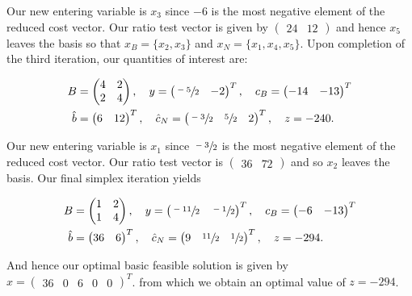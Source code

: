 \begin{solution}
  Our new entering variable is $x_3$ since $-6$ is the most negative element of the reduced cost vector. Our ratio test 
  vector is given by $\begin{pmatrix} 24 & 12 \end{pmatrix}$ and hence $x_5$ leaves the basis so that 
  $x_B = \{ x_2, x_3 \}$ and $x_N = \{ x_1, x_4, x_5 \}$. Upon completion of the third iteration, our quantities of 
  interest are:

  \begin{align*}
    B &= \begin{pmatrix}
      4 & 2 \\
      2 & 4
    \end{pmatrix}, \quad y = \begin{pmatrix}
      \sfrac{-5}{2} & -2
    \end{pmatrix}^T, \quad c_B = \begin{pmatrix}
      -14 & -13
    \end{pmatrix}^T \\
    \hat{b} &= \begin{pmatrix}
      6 & 12
    \end{pmatrix}^T, \quad \hat{c}_N = \begin{pmatrix}
      \sfrac{-3}{2} & \sfrac{5}{2} & 2
    \end{pmatrix}^T, \quad z = -240.
  \end{align*}

  Our new entering variable is $x_1$ since $\sfrac{-3}{2}$ is the most negative element of the reduced cost vector. Our
  ratio test vector is $\begin{pmatrix} 36 & 72 \end{pmatrix}$ and so $x_2$ leaves the basis. Our final
  simplex iteration yields


  \begin{align*}
    B &= \begin{pmatrix}
      1 & 2 \\
      1 & 4
    \end{pmatrix}, \quad y = \begin{pmatrix}
      \sfrac{-11}{2} & \sfrac{-1}{2}
    \end{pmatrix}^T, \quad c_B = \begin{pmatrix}
      -6 & -13
    \end{pmatrix}^T \\
    \hat{b} &= \begin{pmatrix}
      36 & 6
    \end{pmatrix}^T, \quad \hat{c}_N = \begin{pmatrix}
      9 & \sfrac{11}{2} & \sfrac{1}{2}
    \end{pmatrix}^T, \quad z = -294.
  \end{align*}

  And hence our optimal basic feasible solution is given by $x = \begin{pmatrix} 36 & 0 & 6 & 0 & 0 \end{pmatrix}^T$.
  from which we obtain an optimal value of $z = -294$.
\end{solution}
